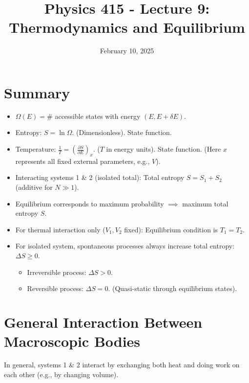 \documentclass[11pt]{article}
\title{Physics 415 - Lecture 9: Thermodynamics and Equilibrium}
\date{February 10, 2025}
\author{} %
\newcommand{\pderiv}[2]{\frac{\partial #1}{\partial #2}}
\newcommand{\deltaE}{\delta E}
\begin{document}
\maketitle
\thispagestyle{empty}

\section*{Summary}

\begin{itemize}
    \item $\Omega(E) = \#$ accessible states with energy $(E, E+\deltaE)$.
    \item Entropy: $S = \ln \Omega$. (Dimensionless). State function.
    \item Temperature: $\frac{1}{T} = \left( \pderiv{S}{E} \right)_x$. ($T$ in energy units). State function. (Here $x$ represents all fixed external parameters, e.g., $V$).
    \item Interacting systems 1 \& 2 (isolated total): Total entropy $S = S_1 + S_2$ (additive for $N \gg 1$).
    \item Equilibrium corresponds to maximum probability $\implies$ maximum total entropy $S$.
    \item For thermal interaction only ($V_1, V_2$ fixed): Equilibrium condition is $T_1 = T_2$.
    \item For isolated system, spontaneous processes always increase total entropy: $\Delta S \ge 0$.
        \begin{itemize}
            \item Irreversible process: $\Delta S > 0$.
            \item Reversible process: $\Delta S = 0$. (Quasi-static through equilibrium states).
        \end{itemize}
\end{itemize}

\section*{General Interaction Between Macroscopic Bodies}

In general, systems 1 \& 2 interact by exchanging both heat and doing work on each other (e.g., by changing volume).

\begin{center}
\end{center}
\end{document}
